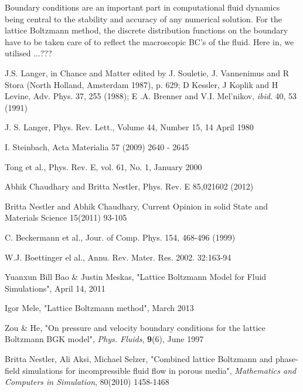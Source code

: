 \documentclass[12pt,a4paper]{report}
\begin{document}
	Boundary conditions are an important part in computational fluid dynamics being central to the stability and accuracy of any numerical solution. 
	For the lattice Boltzmann method, the discrete distribution functions on the boundary have to be taken care of to reflect the macroscopic BC's of the fluid. Here in, we utilised ...???
\begin{thebibliography}{1}
	
   J.S. Langer, in Chance and Matter edited by J. Souletie, J. Vannenimus 
	and R Stora (North Holland, Amsterdam 1987), p. 629; D Kessler, J Koplik and H Levine, Adv. 
	Phys. 37, 255 (1988); E .A. Brenner and V.I. Mel'nikov, \textit{ibid}. 40, 53 (1991)
	
   J. S. Langer, Phys. Rev. Lett., Volume 44, Number 15, 14 April 1980 

   I. Steinbach, Acta Materialia 57 (2009) 2640 - 2645

   Tong et al., Phys. Rev. E, vol. 61, No. 1, January 2000

   Abhik Chaudhary and Britta Nestler, Phys. Rev. E 85,021602 (2012)
  
   Britta Nestler and Abhik Chaudhary, Current Opinion in solid State 
  and Materials Science 15(2011) 93-105
  
   C. Beckermann et al., Jour. of Comp. Phys. 154, 468-496 (1999)
  
   W.J. Boettinger el al., Annu. Rev. Mater. Res. 2002. 32:163-94
  
   Yuanxun Bill Bao \& Justin Meskas, "Lattice Boltzmann Model for Fluid Simulations", April 14, 2011
  
   Igor Mele, "Lattice Boltzmann method", March 2013 
  
   Zou \& He, "On pressure and velocity boundary conditions for the lattice Boltzmann BGK model", {\em Phys. Fluids}, {\bf 9}(6), June 1997 
  
   Britta Nestler, Ali Aksi, Michael Selzer, "Combined lattice Boltzmann and phase-field simulations for incompressible fluid flow in porous media", {\em Mathematics and Computers in Simulation}, 80(2010) 1458-1468
	
\end{thebibliography}
\end{document}
